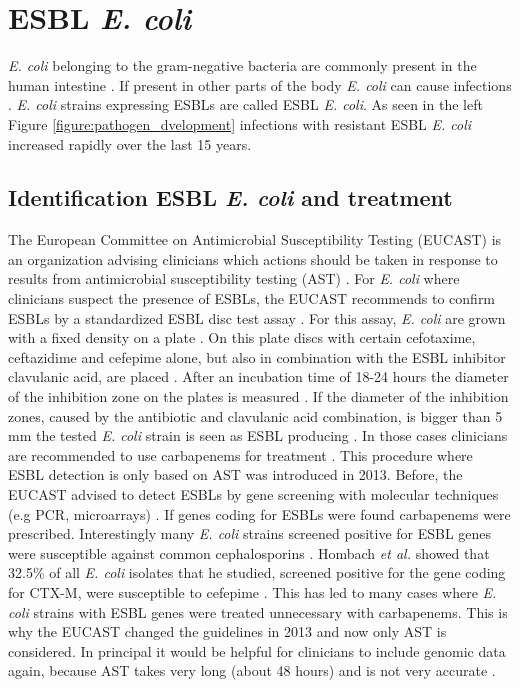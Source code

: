 \section{ESBL \textit{E. coli}}
\textit{E. coli} belonging to the gram-negative bacteria are commonly present in the human intestine \cite{swiss_hospitals_pathogens}. If present in other parts of the body \textit{E. coli} can cause infections \cite{swiss_hospitals_pathogens}.
\textit{E. coli} strains expressing ESBLs are called ESBL \textit{E. coli}. As seen in the left Figure \ref{figure:pathogen_dvelopment} infections with resistant ESBL \textit{E. coli} increased rapidly over the last 15 years. 

\subsection{Identification ESBL \textit{E. coli} and treatment}
The European Committee on Antimicrobial Susceptibility Testing (EUCAST) is an organization advising clinicians which actions should be taken in response to results from  antimicrobial susceptibility testing (AST) \cite{leclercq_eucast_2013}. For \textit{E. coli} where clinicians suspect the presence of ESBLs, the EUCAST recommends to confirm ESBLs by a standardized ESBL disc test assay \cite{hombach_consequences_2013}. For this assay, \textit{E. coli} are grown with a fixed density on a plate \cite{disc_test}. On this plate discs with certain cefotaxime, ceftazidime and cefepime alone, but also in combination with the ESBL inhibitor clavulanic acid, are placed \cite{disc_test}. After an incubation time of 18-24 hours the diameter of the inhibition zone on the plates is measured \cite{disc_test}. If the diameter of the inhibition zones, caused by the antibiotic and clavulanic acid combination, is bigger than 5 mm the tested \textit{E. coli} strain is seen as ESBL producing \cite{disc_test}. In those cases clinicians are recommended to use carbapenems for treatment \cite{mcwilliams_incidence_2014}. This procedure where ESBL detection is only based on AST was introduced in 2013. Before, the EUCAST advised to detect ESBLs by gene screening with molecular techniques (e.g PCR, microarrays) \cite{screening}. If genes coding for ESBLs were found carbapenems were prescribed. Interestingly many \textit{E. coli} strains screened positive for ESBL genes were susceptible against common cephalosporins \cite{hombach_consequences_2013}.
Hombach \textit{et al.} showed that 32.5\% of all \textit{E. coli} isolates that he studied, screened positive for the gene coding for CTX-M, were susceptible to cefepime \cite{hombach_consequences_2013}. This has led to many cases where \textit{E. coli} strains with ESBL genes were treated unnecessary with carbapenems. This is why the EUCAST changed the guidelines in 2013 and now only AST is considered. In principal it would be helpful for clinicians to include genomic data again, because AST takes very long (about 48 hours) and is not very accurate \cite{disc_test}\cite{hombach_consequences_2013}.

